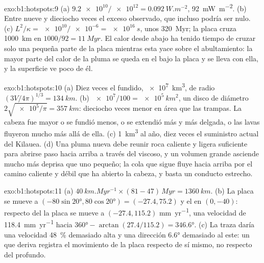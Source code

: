 \begin{solution}{exo:b1:hotspots:9}
(a) $\num{9.2e10}/\num{e12} = \qty{0.092}{W.m^{-2}}$, \qty{92}{mW.m^{-2}}.
(b) Entre nueve y dieciocho veces el exceso observado, que incluso podría ser nulo.
(c) $L^2/\kappa =
\num{e10}/\num{e-6} = \qty{e16}{s}$, unos \qty{320}{Myr}; la placa cruza
\qty{1000}{km} en $1000/92 = \qty{11}{Myr}$. El calor desde abajo ha tenido tiempo de
cruzar solo una pequeña parte de la placa mientras esta yace sobre el abultamiento: la mayor parte del
calor de la pluma se queda en el  bajo la placa y se lleva con
ella, y la superficie ve poco de él.
\end{solution}

\begin{solution}{exo:b1:hotspots:10}
(a) Diez veces el fundido, \qty{e7}{km^3}, de radio
$(3V/4\pi)^{1/3} = \qty{134}{km}$. (b) $\num{e7}/100 = \qty{e5}{km^2}$, un disco
de diámetro $2\sqrt{\num{e5}/\pi} = \qty{357}{km}$: dieciocho veces menor en área
que las trampas. La cabeza fue mayor o se fundió menos, o se extendió más y más
delgada, o las lavas fluyeron mucho más allá de ella. (c) \qty{1}{km^3} al año, diez
veces el suministro actual del Kilauea. (d) Una pluma nueva debe reunir roca caliente y ligera
suficiente para abrirse paso hacia arriba a través del  viscoso, y un volumen grande
asciende mucho más deprisa que uno pequeño; la cola que sigue fluye hacia arriba por el camino caliente y débil que ha abierto la cabeza, y basta un conducto estrecho.
\end{solution}

\begin{solution}{exo:b1:hotspots:11}
(a) $\qty{40}{km.Myr^{-1}}\times(81 - 47)\,\unit{Myr} = \qty{1360}{km}$.
(b) La placa se mueve a $(-80\sin\ang{20}, 80\cos\ang{20}) = (-27.4, 75.2)$
y el  en $(0, -40)$: respecto del  la placa se mueve a
$(-27.4, 115.2)$ \unit{mm.yr^{-1}}, una velocidad de \qty{118.4}{mm.yr^{-1}} hacia
$\ang{360} - \arctan(27.4/115.2) = \ang{346.6}$. (c) La traza daría una
velocidad \qty{48}{\percent} demasiado alta y una dirección \ang{6.6} demasiado al este:
un  que deriva registra el movimiento de la placa respecto de sí mismo, no respecto del  profundo.
\end{solution}

